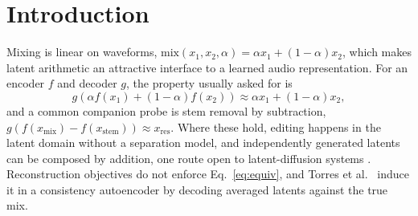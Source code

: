 \documentclass[conference]{IEEEtran}
\begin{document}
\section{Introduction}\label{sec:intro}
Mixing is linear on waveforms,
$\mathrm{mix}(x_1,x_2,\alpha)=\alpha x_1+(1{-}\alpha)x_2$, which makes latent
arithmetic an attractive interface to a learned audio representation. For an
encoder $f$ and decoder $g$, the property usually asked for is
\begin{equation}
  g\!\left(\alpha f(x_1)+(1{-}\alpha)f(x_2)\right)\approx \alpha x_1+(1{-}\alpha)x_2 ,
  \label{eq:equiv}
\end{equation}
and a common companion probe is stem removal by subtraction,
$g(f(x_\mathrm{mix}){-}f(x_\mathrm{stem}))\approx x_\mathrm{res}$. Where these
hold, editing happens in the latent domain without a separation model, and
independently generated latents can be composed by addition, one route open to
latent-diffusion systems \cite{liu2023audioldm,evans2024stable}.
Reconstruction objectives do not enforce Eq.~\ref{eq:equiv}, and Torres et
al.~\cite{torres2026linearity} induce it in a consistency autoencoder by
decoding averaged latents against the true mix.
\end{document}
